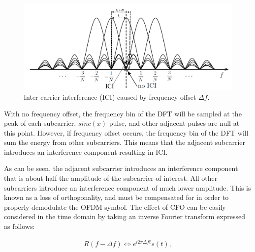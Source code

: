 \begin{figure}
	\centerline{\includegraphics [width=0.8\columnwidth] {Figures/OFDM-subcarrier-freoff.pdf} }
	\caption{Inter carrier interference (ICI) caused by frequency offset $\Delta f$.}
	\label{fig:OFDM-subcarrier-freoff}
\end{figure}

With no frequency offset, the frequency bin of the DFT will be sampled at  the peak of each subcarrier, $sinc(x)$ pulse, and other adjacent pulses are null at this point.
However, if frequency offset occurs, the frequency bin of the DFT will sum the energy from other subcarriers.
This means that the adjacent subcarrier introduces an interference component resulting in ICI.

As can be seen, the adjacent subcarrier introduces an interference component that is about half the amplitude of the subcarrier of interest.
All other subcarriers introduce an interference component of much lower amplitude.
This is known as a loss of orthogonality, and must be compensated for in order to properly demodulate the OFDM symbol.
The effect of CFO can be easily considered in the time domain by taking an inverse Fourier transform expressed as follows:

\begin{eqnarray}
\label{equ:}
             R(f - \Delta f) \Leftrightarrow  e^{i2\pi \Delta ft} s(t),
\end{eqnarray}

